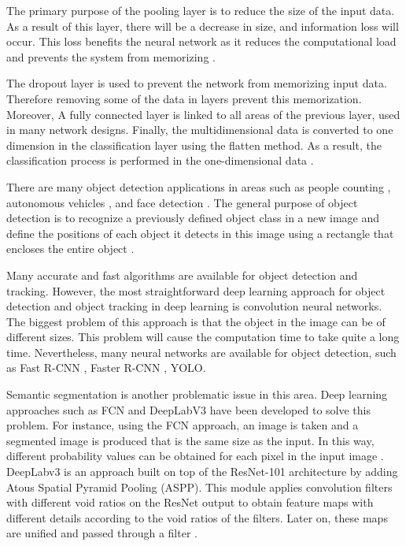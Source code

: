 The primary purpose of the pooling layer is to reduce the size of the input data. As a result of this layer, there will be a decrease in size, and information loss will occur. This loss benefits the neural network as it reduces the computational load and prevents the system from memorizing \cite{goodfellow2016deep}.

The dropout layer is used to prevent the network from memorizing input data. Therefore removing some of the data in layers prevent this memorization. Moreover, A fully connected layer is linked to all areas of the previous layer, used in many network designs. Finally, the multidimensional data is converted to one dimension in the classification layer using the flatten method. As a result, the classification process is performed in the one-dimensional data \cite{goodfellow2016deep}.

There are many object detection applications in areas such as people counting \cite{nogueira2019retailnet}, autonomous vehicles \cite{rausch2017learning}, and face detection \cite{yang2015facial}. The general purpose of object detection is to recognize a previously defined object class in a new image and define the positions of each object it detects in this image using a rectangle that encloses the entire object \cite{goodfellow2016deep}.

Many accurate and fast algorithms are available for object detection and tracking. However, the most straightforward deep learning approach for object detection and object tracking in deep learning is convolution neural networks.  The biggest problem of this approach is that the object in the image can be of different sizes. This problem will cause the computation time to take quite a long time. Nevertheless, many neural networks are available for object detection, such as Fast R-CNN \cite{girshick2015fast}, Faster R-CNN \cite{ren2016faster}, YOLO\cite{redmon2018yolov3}.

Semantic segmentation is another problematic issue in this area. Deep learning approaches such as FCN and DeepLabV3 have been developed to solve this problem. For instance, using the FCN approach, an image is taken and a segmented image is produced that is the same size as the input. In this way, different probability values can be obtained for each pixel in the input image \cite{long2015fully}. DeepLabv3 is an approach built on top of the ResNet-101 \cite{deepResidualLearning2016} architecture by adding Atous Spatial Pyramid Pooling (ASPP). This module applies convolution filters with different void ratios on the ResNet output to obtain feature maps with different details according to the void ratios of the filters. Later on, these maps are unified and passed through a filter \cite{chen2017rethinking}.
